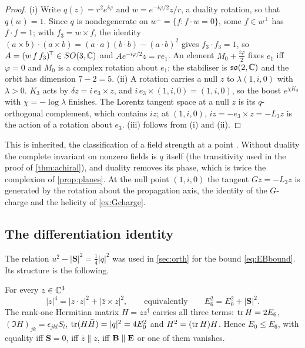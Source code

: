 \begin{proof}
(i) Write $q(z)=r^2e^{i\varphi}$ and $w=e^{-i\varphi/2}z/r$, a duality rotation, so that $q(w)=1$. Since $q$ is nondegenerate on
$w^\perp=\{f:f\cdot w=0\}$, some $f\in w^\perp$ has $f\cdot f=1$; with $f_3=w\times f$, the identity
$(a\times b)\cdot(a\times b)=(a\cdot a)(b\cdot b)-(a\cdot b)^2$ gives $f_3\cdot f_3=1$, so $A=(w\,f\,f_3)^{\!\top}\in SO(3,\mathbb{C})$ and
$Ae^{-i\varphi/2}z=re_1$. An element $M_0+\tfrac{i\varphi}2$ fixes $e_1$ iff $\varphi=0$ and $M_0$ is a complex rotation about $e_1$; the stabiliser is
$\mathfrak{so}(2,\mathbb{C})$ and the orbit has dimension $7-2=5$. (ii) A rotation carries a null $z$ to $\lambda(1,i,0)$ with $\lambda>0$. $K_3$ acts by
$\delta z=i\,e_3\times z$, and $i\,e_3\times(1,i,0)=(1,i,0)$, so the boost $e^{\chi K_3}$ with $\chi=-\log\lambda$ finishes. The Lorentz tangent space
at a null $z$ is its $q$-orthogonal complement, which contains $iz$; at $(1,i,0)$, $iz=-e_3\times z=-L_3z$ is the action of a rotation about $e_3$. (iii)
follows from (i) and (ii).
\end{proof}

This is inherited, the classification of a field strength at a point \cite{Synge56,LandauLifshitz2}. Without duality the complete invariant
on nonzero fields is $q$ itself (the transitivity used in the proof of \cref{thm:achiral}), and duality removes its phase, which is twice the
complexion of \cref{prop:planes}. At the null point $(1,i,0)$ the tangent $Gz=-L_3z$ is generated by the rotation about the propagation axis, the identity of the $G$-charge and the
helicity of \cref{ex:Gcharge}.

\subsection{The differentiation identity}
\label{sec:energy-identity}

The relation $u^2-|\mathbf S|^2=\tfrac14|q|^2$ was used in \cref{sec:orth} for the bound \eqref{eq:EBbound}. Its structure is the following.

\begin{proposition}
\label{en:split}
For every $z\in\mathbb{C}^3$
\begin{equation}
\label{en:lagrange}
|z|^4=|z\cdot z|^2+|\bar z\times z|^2,\qquad\text{equivalently}\qquad E_6^2=E_0^2+|\mathbf S|^2 .
\end{equation}
The rank-one Hermitian matrix $H=zz^\dagger$ carries all three terms: $\operatorname{tr} H=2E_6$, $(\Im H)_{jk}=\epsilon_{jkl}S_l$, $\operatorname{tr}(H\bar H)=|q|^2=4E_0^2$ and
$H^2=(\operatorname{tr} H)H$. Hence $E_0\le E_6$, with equality iff $\mathbf S=0$, iff $\bar z\parallel z$, iff $\mathbf B\parallel\mathbf E$ or one of them vanishes.
\end{proposition}

